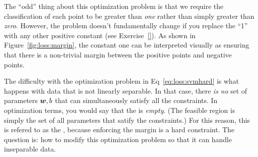 \begin{comment}
There are two aspects of this optimization problem that are not
immediately obvious.  The first is the constraint that the norm of the
weight vector is at most $1$.  This constraint is necessary in order
to avoid degenerate solutions.  In particular, suppose you solved the
optimization problem \emph{with} this constraint in place.  You found
some optimal solution $\vw^*,b^*$.  Now, consider what happens if you
were to remove the norm constraint.  You could then look at
$2\vw^*,2b$.  The constraints would still be satisfied, but you would
have \emph{doubled} the size of the margin!  You could do this again,
eventually getting an infinitely large margin with $\infty\vw^*,\infty
b$ as parameters.  The constraint on the norm of $\vw$ is to ensure
that this doesn't happen.

\thinkaboutit{You can also think about the constraint on $\vw$ in
  terms of the fact that it's not $\vw$ we care about, but rather the
  hyperplane it defines.  Why does this suggest that constraining the
  norm of $\vw$ is reasonable?}
\end{comment}


The ``odd'' thing about this optimization problem is that we require
the classification of each point to be greater than \emph{one} rather
than simply greater than \emph{zero}.  However, the problem doesn't
fundamentally change if you replace the ``1'' with any other positive
constant (see Exercise~\ref{}).  As shown in
Figure~\ref{fig:loss:margin}, the constant one can be interpreted
visually as ensuring that there is a non-trivial margin between the
positive points and negative points.

The difficulty with the optimization problem in
Eq~\eqref{eq:loss:svmhard} is what happens with data that is not
linearly separable.  In that case, there \emph{is no} set of
parameters ${\boldsymbol{w}},b$ that can simultaneously satisfy all the
constraints.  In optimization terms, you would say that the
 is \emph{empty}.  (The feasible region is
simply the set of all parameters that satify the constraints.)  For
this reason, this is refered to as the ,
because enforcing the margin is a hard constraint.  The question is:
how to modify this optimization problem so that it can handle
inseparable data.



